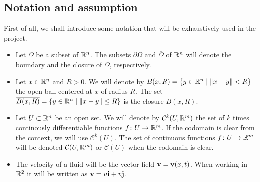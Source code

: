 
\subsection{Notation and assumption}

First of all, we shall introduce some notation that will be exhaustively used in
the project.
\begin{itemize}[topsep=0pt]
    \item Let $\Omega$ be a subset of $\mathbb{R}^n$. The subsets $\partial \Omega$ and
    $\overline{\Omega}$ of $\mathbb{R}^n$ will denote the boundary and the closure of $\Omega$,
    respectively. 
    \item Let $x \in \mathbb{R}^n$ and $R > 0$. We will denote by $B(x, R) = \{y \in
    \mathbb{R}^n \mid \norm{x - y} < R \}$ the open ball centered at $x$ of radius
    $R$. The set $\overline{B(x, R)} = \{y \in \mathbb{R}^n \mid \norm{x - y} \leq R
    \}$ is the closure $B(x, R)$.
    \item Let $U \subset \mathbb{R}^n$ be an open set. We will denote by
    $\mathcal{C}^k(U, \mathbb{R}^m)$ the set of $k$ times continously differentiable
    functions $f \colon U \rightarrow \mathbb{R}^m$. If the codomain is clear from
    the context, we will use $\mathcal{C}^k(U)$. The set of continuous functions
    $f \colon U \rightarrow \mathbb{R}^m$ will be denoted $\mathcal{C}(U, \mathbb{R}^m)$
    or $\mathcal{C}(U)$ when the codomain is clear.
	\item The velocity of a fluid will be the vector field $\vb{v} =
	\vb{v}(x,t)$. When working in $\mathbb{R}^2$ it will be written as $\vb{v} = u
	\vb{i} + v \vb{j}$.
\end{itemize}

